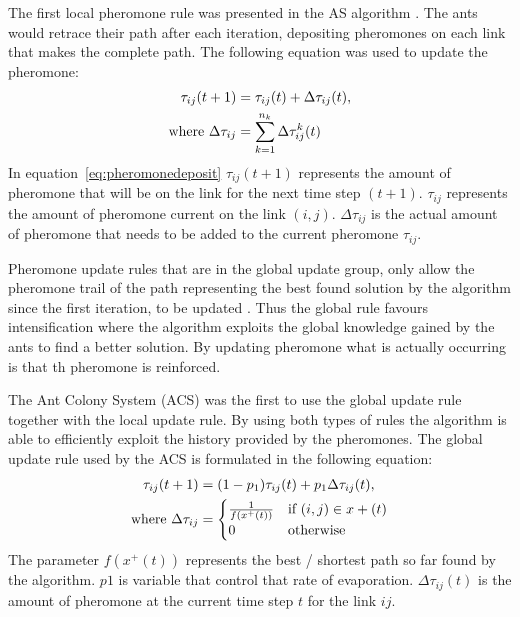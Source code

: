 The first local pheromone rule was presented in the AS algorithm \cite{CompuIntelligenceIntro,AntSurvey,AntsAndStigmergy}. The ants would retrace their path after each iteration, depositing pheromones on each link that makes the complete path. The following equation was used to update the pheromone:
\begin{align}
\label{eq:pheromonedeposit}
 \tau_{ij}(t+1) &= \tau_{ij}(t) + \Delta\tau_{ij}(t),\\ 
 \text{where }\Delta\tau_{ij} &= \sum^{n_k}_{k=1}\Delta\tau^k_{ij}(t) \notag
\end{align}
In equation~\ref{eq:pheromonedeposit} $\tau_{ij}(t+1)$ represents the amount of pheromone that will be on the link for the next time step $(t+1)$. $\tau_{ij}$ represents the amount of pheromone current on the link $(i,j)$. $\Delta\tau_{ij}$ is the actual amount of pheromone that needs to be added to the current pheromone $\tau_{ij}$.

Pheromone update rules that are in the global update group, only allow the pheromone trail of the path representing the best found solution by the algorithm since the first iteration, to be updated \cite{CompuIntelligenceIntro}. Thus the global rule favours intensification where the algorithm exploits the global knowledge gained by the ants to find a better solution. By updating pheromone what is actually occurring is that th pheromone is reinforced.

The Ant Colony System (ACS) was the first to use the global update rule together with the local update rule\cite{CompuIntelligenceIntro}. By using both types of rules the algorithm is able to efficiently exploit the history provided by the pheromones\cite{CompuIntelligenceIntro}. The global update rule used by the ACS is formulated in the following equation\cite{CompuIntelligenceIntro}:
\begin{align}
\label{eq:pheromoneupdate}
	\tau_{ij}(t + 1) &= (1 - p_1)\tau_{ij}(t) + p_1\Delta\tau_{ij}(t),\\
	\text{where }\Delta\tau_{ij} &= \notag
	\begin{cases}
		\frac{1}{f(x^+(t))} &\text{if $(i,j) \in x+(t)$}\\
		0 &\text{otherwise}
	\end{cases}
\end{align}
The parameter $f(x^+(t))$ represents the best / shortest path so far found by the algorithm\cite{CompuIntelligenceIntro}. $p1$ is variable that control that rate of evaporation. $\Delta\tau_{ij}(t)$ is the amount of pheromone at the current time step $t$ for the link $ij$.

